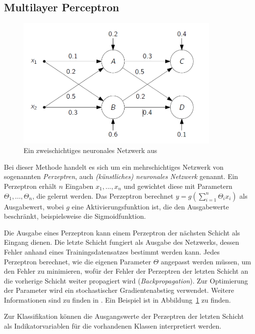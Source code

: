 \subsection{Multilayer Perceptron}
\begin{figure}
\centering
\includegraphics[width=100mm]{img/neural-network}
\caption{Ein zweischichtiges neuronales Netzwerk aus \cite{baumann2016}}
\label{fig:neural-network}
\end{figure}
Bei dieser Methode handelt es sich um ein mehrschichtiges Netzwerk von sogenannten \textit{Perzeptren}, auch \textit{(künstliches) neuronales Netzwerk} genannt. Ein Perzeptron erhält $n$ Eingaben $x_1, ..., x_n$ und gewichtet diese mit Parametern $\Theta_1, ..., \Theta_n$, die gelernt werden. Das Perzeptron berechnet $y = g(\sum_{i=1}^{n} \Theta_i x_i)$ als Ausgabewert, wobei $g$ eine Aktivierungsfunktion ist, die den Ausgabewerte beschränkt, beispielsweise die Sigmoidfunktion.

Die Ausgabe eines Perzeptron kann einem Perzeptron der nächsten Schicht als Eingang dienen. Die letzte Schicht fungiert als Ausgabe des Netzwerks, dessen Fehler anhand eines Trainingsdatensatzes bestimmt werden kann. Jedes Perzeptron berechnet, wie die eigenen Parameter $\Theta$ angepasst werden müssen, um den Fehler zu minimieren, wofür der Fehler der Perzeptren der letzten Schicht an die vorherige Schicht weiter propagiert wird (\textit{Backpropagation}). Zur Optimierung der Parameter wird ein stochastischer Gradientenabstieg verwendet. Weitere Informationen sind zu finden in \cite{Haykin1994}. Ein Beispiel ist in Abbildung~\ref{fig:neural-network} zu finden.

Zur Klassifikation können die Ausgangswerte der Perzeptren der letzten Schicht als Indikatorvariablen für die vorhandenen Klassen interpretiert werden.